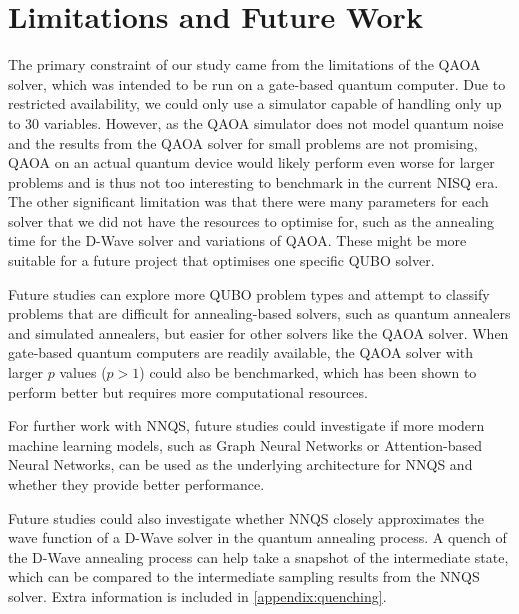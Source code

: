 \section{Limitations and Future Work}
The primary constraint of our study came from the limitations of the QAOA solver, which was intended to be run on a gate-based quantum computer. Due to restricted availability, we could only use a simulator capable of handling only up to $30$ variables. However, as the QAOA simulator does not model quantum noise and the results from the QAOA solver for small problems are not promising, QAOA on an actual quantum device would likely perform even worse for larger problems and is thus not too interesting to benchmark in the current NISQ era. The other significant limitation was that there were many parameters for each solver that we did not have the resources to optimise for, such as the annealing time for the D-Wave solver and variations of QAOA. These might be more suitable for a future project that optimises one specific QUBO solver.

Future studies can explore more QUBO problem types and attempt to classify problems that are difficult for annealing-based solvers, such as quantum annealers and simulated annealers, but easier for other solvers like the QAOA solver. When gate-based quantum computers are readily available, the QAOA solver with larger $p$ values ($p > 1$) could also be benchmarked, which has been shown to perform better but requires more computational resources.

For further work with NNQS, future studies could investigate if more modern machine learning models, such as Graph Neural Networks or Attention-based Neural Networks, can be used as the underlying architecture for NNQS and whether they provide better performance.

Future studies could also investigate whether NNQS closely approximates the wave function of a D-Wave solver in the quantum annealing process. A quench of the D-Wave annealing process can help take a snapshot of the intermediate state, which can be compared to the intermediate sampling results from the NNQS solver. Extra information is included in \autoref{appendix:quenching}.